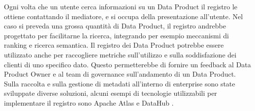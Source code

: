 \documentclass[12pt]{report}
\begin{document}
Ogni volta che un utente cerca informazioni su un Data Product il registro le ottiene contattando il mediatore, e si occupa della presentazione all'utente.
Nel caso si preveda una grossa quantità di Data Product, il registro andrebbe progettato per facilitarne la ricerca, integrando per esempio meccanismi di ranking e ricerca semantica.
Il registro dei Data Product potrebbe essere utilizzato anche per raccogliere metriche sull'utilizzo e sulla soddisfazione dei clienti di uno specifico dato.
Questo permetterebbe di fornire un feedback al Data Product Owner e al team di governance sull'andamento di un Data Product.
Sulla raccolta e sulla gestione di metadati all'interno di enterprise sono state sviluppate diverse soluzioni, alcuni esempi di tecnologie utilizzabili per implementare il registro sono Apache Atlas e DataHub \cite{dataHub, atlas_docs}.
\end{document}
